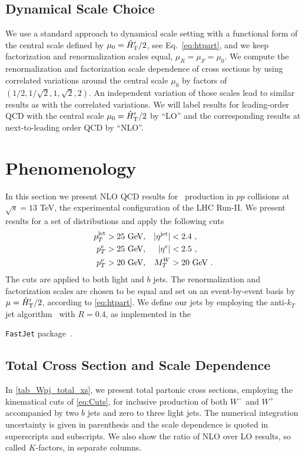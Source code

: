 \subsection{Dynamical Scale Choice}
\label{sec:scale}
We use a standard approach to dynamical scale setting with a functional form of the central scale defined by $\mu_0={\hat H}_{\mathrm T}'/2$, see Eq.~\eqref{eq:htpart}, and we keep factorization and renormalization
scales equal, $\mu_R=\mu_F=\mu_0$. We compute the renormalization and factorization scale dependence of cross sections by using correlated variations around the central scale $\mu_0$ by factors of
$(1/2,1/\sqrt{2},1,\sqrt{2},2)$. An independent variation of those scales lead to similar results as with the correlated variations. We will label results for leading-order QCD with the central scale
$\mu_0={\hat H}_{\mathrm T}'/2$ by ``LO'' and the corresponding results at next-to-leading
order QCD by ``NLO''.


\section{Phenomenology}
In this section we present NLO QCD results for \Wbbn~production in
$pp$ collisions at $\sqrt{s}=13$ TeV, the experimental configuration
of the LHC Run-II. We present results for a set of distributions and
apply the following cuts
\begin{align}
  p_T^{\text{jet}}&>25\text{ GeV},& |\eta^{\text{jet}}|&<2.4\ ,\notag\\
  p_T^{e}&>25\text{ GeV},& |\eta^{e}|&<2.5\ ,\notag\\
  p_T^{\nu}&>20\text{ GeV},& M_T^W &> 20\text{ GeV}\ .
  \label{eq:Cuts}
\end{align}
The cuts are applied to both light  and
$b$ jets. The renormalization and factorization scales are chosen to be equal and set on an
event-by-event basis by $\mu={\hat H}_{\mathrm T}'/2$, according to
\cref{eq:htpart}. We define our jets by employing the
anti-$k_T$ jet algorithm~\cite{antikT} with $R=0.4$, as implemented in the

\texttt{FastJet} package~\cite{Cacciari:2011ma}.

\subsection{Total Cross Section and Scale Dependence}
\label{totalxsw}
In \cref{tab_Wpj_total_xs}, we present total partonic cross sections,
employing the kinematical cuts of \cref{eq:Cuts}, for inclusive production of
both $W^-$ and $W^+$ accompanied by two $b$ jets and zero to three
light jets. The numerical integration uncertainty is given in parenthesis and
the scale dependence is quoted in superscripts and subscripts. We also show
the ratio of NLO over LO results, so called $K$-factors, in separate columns.

